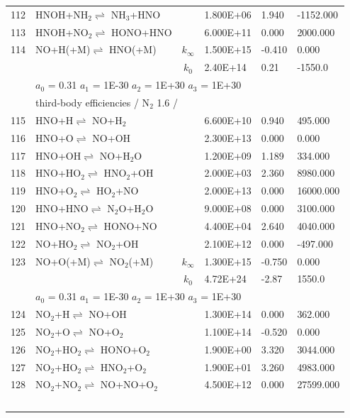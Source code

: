 \documentclass[11pt]{article}
\begin{document}
\begin{table}[hbt]
\begin{tabular}{|r l c l l l|}
112 &	HNOH+NH$_{2}$$\rightleftharpoons$ NH$_{3}$+HNO&	&	1.800E+06&	1.940&	-1152.000\\ 
113 &	HNOH+NO$_{2}$$\rightleftharpoons$ HONO+HNO&	&	6.000E+11&	0.000&	2000.000\\ 
114 &	NO+H(+M)$\rightleftharpoons$ HNO(+M)&	$k_{\infty}$&	1.500E+15&	-0.410&	0.000\\ 
	&	&	$k_0$&	2.40E+14& 0.21&	-1550.0\\ 
	&\multicolumn{5}{l|}{	$a_0$ = 0.31	$a_1$ = 1E-30	$a_2$ = 1E+30	$a_3$ = 1E+30}\\ 
	&\multicolumn{5}{l|}{third-body efficiencies  / N$_{2}$ 1.6 /}\\ 
115 &	HNO+H$\rightleftharpoons$ NO+H$_{2}$&	&	6.600E+10&	0.940&	495.000\\ 
116 &	HNO+O$\rightleftharpoons$ NO+OH&	&	2.300E+13&	0.000&	0.000\\ 
117 &	HNO+OH$\rightleftharpoons$ NO+H$_{2}$O&	&	1.200E+09&	1.189&	334.000\\ 
118 &	HNO+HO$_{2}$$\rightleftharpoons$ HNO$_{2}$+OH&	&	2.000E+03&	2.360&	8980.000\\ 
119 &	HNO+O$_{2}$$\rightleftharpoons$ HO$_{2}$+NO&	&	2.000E+13&	0.000&	16000.000\\ 
120 &	HNO+HNO$\rightleftharpoons$ N$_{2}$O+H$_{2}$O&	&	9.000E+08&	0.000&	3100.000\\ 
121 &	HNO+NO$_{2}$$\rightleftharpoons$ HONO+NO&	&	4.400E+04&	2.640&	4040.000\\ 
122 &	NO+HO$_{2}$$\rightleftharpoons$ NO$_{2}$+OH&	&	2.100E+12&	0.000&	-497.000\\ 
123 &	NO+O(+M)$\rightleftharpoons$ NO$_{2}$(+M)&	$k_{\infty}$&	1.300E+15&	-0.750&	0.000\\ 
	&	&	$k_0$&	4.72E+24&-2.87&	 1550.0\\ 
	&\multicolumn{5}{l|}{	$a_0$ = 0.31	$a_1$ = 1E-30	$a_2$ = 1E+30	$a_3$ = 1E+30}\\ 
124 &	NO$_{2}$+H$\rightleftharpoons$ NO+OH&	&	1.300E+14&	0.000&	362.000\\ 
125 &	NO$_{2}$+O$\rightleftharpoons$ NO+O$_{2}$&	&	1.100E+14&	-0.520&	0.000\\ 
126 &	NO$_{2}$+HO$_{2}$$\rightleftharpoons$ HONO+O$_{2}$&	&	1.900E+00&	3.320&	3044.000\\ 
127 &	NO$_{2}$+HO$_{2}$$\rightleftharpoons$ HNO$_{2}$+O$_{2}$&	&	1.900E+01&	3.260&	4983.000\\ 
128 &	NO$_{2}$+NO$_{2}$$\rightleftharpoons$ NO+NO+O$_{2}$&	&	4.500E+12&	0.000&	27599.000\\ 
$$
\end{tabular}
\end{table}
\end{document}
